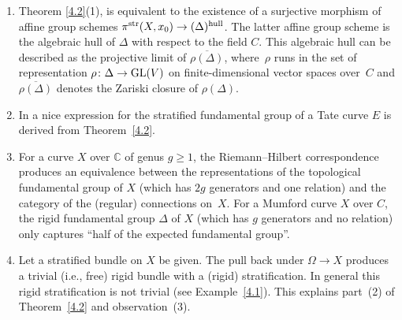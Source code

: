\documentclass[10pt,a4paper]{amsart}
\numberwithin{equation}{section}
\begin{document}
\begin{Observations}\label{4.3} \quad
\begin{enumerate}\itemsep=0pt
\item[(1)] Theorem \ref{4.2}(1), is equivalent to the existence of a surjective morphism of affine group schemes $\pi^{\rm str}(X,x_0)\rightarrow (\Delta)^{\rm hull}$. The latter affine group scheme is the algebraic hull of $\Delta$ with respect to the field $C$. This algebraic hull can be described as the projective limit of $\overline{\rho(\Delta)}$, where~$\rho$ runs in the set of representation $\rho\colon \Delta \rightarrow {\rm GL}(V)$ on finite-dimensional vector spaces over~$C$ and $\overline{\rho(\Delta)}$ denotes the Zariski closure of $\rho(\Delta)$.
\item[(2)]In \cite{Sa} a nice expression for the stratified fundamental group of a Tate curve $E$ is derived from Theorem~\ref{4.2}.
\item[(3)]For a curve $X$ over $\mathbb{C}$ of genus $g\geq 1$, the Riemann--Hilbert correspondence produces an equivalence between the representations of the topological fundamental group of $X$ (which has $2g$ generators and one relation) and the category of the (regular) connections on~$X$. For a Mumford curve $X$ over $C$, the rigid fundamental group $\Delta$ of $X$ (which has $g$ generators and no relation) only captures ``half of the expected fundamental group''.
\item[(4)]Let a stratified bundle on $X$ be given. The pull back under $\Omega \rightarrow X$ produces a trivial (i.e., free) rigid bundle with a (rigid) stratification. In general this rigid stratification is not trivial (see Example~\ref{4.1}). This explains part~(2) of Theorem~\ref{4.2} and observation~(3).
\end{enumerate}
\end{Observations}
\end{document}
